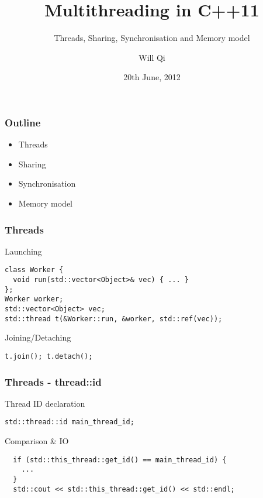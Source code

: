 \documentclass{beamer}
\title{Multithreading in C++11}
\subtitle{Threads, Sharing, Synchronisation and Memory model}
\author{Will Qi}
\date{20th June, 2012}
\begin{document}
\maketitle

\begin{frame}
  \frametitle{Outline}
  \begin{itemize}
  \item Threads
    \pause
  \item Sharing
    \pause
  \item Synchronisation
    \pause
  \item Memory model
  \end{itemize}
\end{frame}

\begin{frame}[fragile]
  \frametitle{Threads}
  \begin{block}{Launching}
\begin{verbatim}
class Worker {
  void run(std::vector<Object>& vec) { ... }
};
Worker worker;
std::vector<Object> vec;
std::thread t(&Worker::run, &worker, std::ref(vec));
\end{verbatim}
  \end{block}
  \pause
  \begin{block}{Joining/Detaching}
\begin{verbatim}
t.join(); t.detach();
\end{verbatim}
  \end{block}
\end{frame}

\begin{frame}[fragile]
  \frametitle{Threads - thread::id}
  \begin{block}{Thread ID declaration}
\begin{verbatim}
std::thread::id main_thread_id;
\end{verbatim}
  \end{block}
  \pause
  \begin{block}{Comparison \& IO}
\begin{verbatim}
  if (std::this_thread::get_id() == main_thread_id) {
    ...
  }
  std::cout << std::this_thread::get_id() << std::endl;
\end{verbatim}
  \end{block}
\end{frame}
\end{document}

